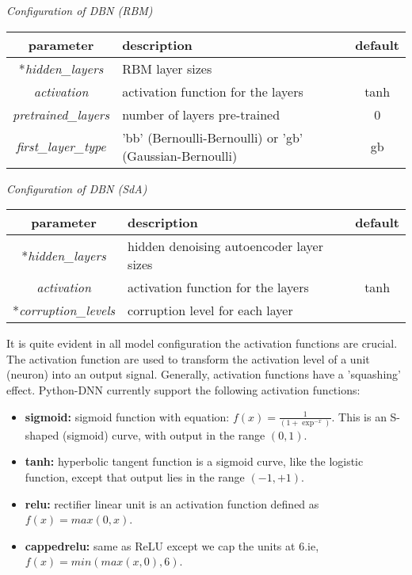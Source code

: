 \begin{table}[!htbp] 
 \begin{center}
  	\medskip  \small \textit{Configuration of DBN (RBM)}
	\begin{tabular}{|c|p{8cm}|c|} \hline
   	\textbf{parameter} & \textbf{description} & \textbf{default}\\  \hline
	*\emph{hidden\_layers} &  RBM layer sizes & \\ \hline
	\emph{activation} & activation function for the layers & tanh \\ \hline
	\emph{pretrained\_layers} & number of layers  pre-trained & 0 \\ \hline
	\emph{first\_layer\_type} & 'bb' (Bernoulli-Bernoulli) or 'gb' (Gaussian-Bernoulli) & gb  \\ 	\hline 
	\end{tabular}		
\end{center}
\end{table} 
\begin{table}[!htbp] 
 \begin{center}
  	\medskip  \small \textit{Configuration of DBN (SdA)}
	\begin{tabular}{|c|p{8cm}|c|} \hline
   	\textbf{parameter} & \textbf{description} & \textbf{default}\\  \hline
	*\emph{hidden\_layers} &  hidden denoising autoencoder layer sizes & \\ \hline
	\emph{activation} & activation function for the layers & tanh \\ \hline
	*\emph{corruption\_levels} & corruption level for each layer &  \\ \hline
	\end{tabular}		
\end{center} 
\end{table} 
\noindent It is quite evident in all model configuration the activation functions are crucial.  The activation function are used to transform the activation level of a unit (neuron) into an output signal.  Generally, activation functions have a 'squashing' effect.  Python-DNN currently support the following activation functions:
\begin{itemize}
\item {\textbf{sigmoid:} sigmoid function with equation: $f(x) = \frac{1}{(1 + \exp^{-x})}$. This is an S-shaped (sigmoid) curve, with output in the range $(0,1)$.}
\item {\textbf{tanh:} hyperbolic tangent function is a sigmoid curve, like the logistic function, except that output lies in the range $(-1,+1)$.} 
\item {\textbf{relu:} rectifier linear unit is an activation function defined as $f(x) = max(0, x)$.}
\item {\textbf{cappedrelu:} same as ReLU except we cap the units at 6.ie, $f(x) = min(max(x,0),6)$.}
\end{itemize}
\clearpage

